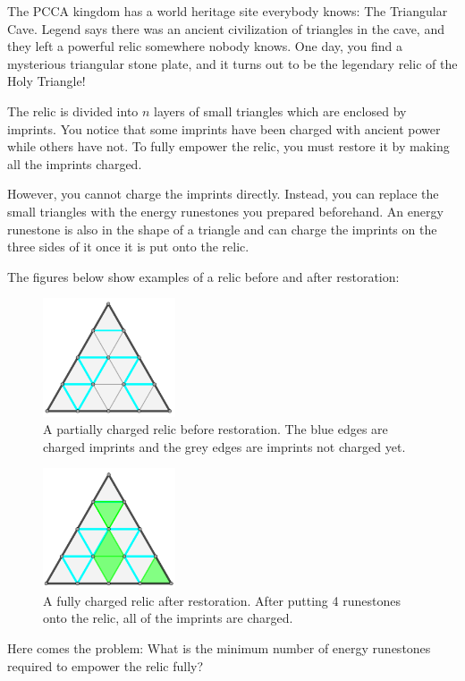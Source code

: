 The PCCA kingdom has a world heritage site everybody knows: The Triangular Cave.
Legend says there was an ancient civilization of triangles in the cave, and they left a powerful relic somewhere nobody knows.
One day, you find a mysterious triangular stone plate, and it turns out to be the legendary relic of the Holy Triangle!

The relic is divided into $n$ layers of small triangles which are enclosed by imprints.
You notice that some imprints have been charged with ancient power while others have not.
To fully empower the relic, you must restore it by making all the imprints charged.

However, you cannot charge the imprints directly.
Instead, you can replace the small triangles with the energy runestones you prepared beforehand.
An energy runestone is also in the shape of a triangle and can charge the imprints on the three sides of it once it is put onto the relic.

The figures below show examples of a relic before and after restoration:

\begin{figure}[h]
\center
\includegraphics[width=0.35\textwidth]{image/relic1.png}
\caption{A partially charged relic before restoration. The blue edges are charged imprints and the grey edges are imprints not charged yet.}
\end{figure}
\begin{figure}[h]
\center
\includegraphics[width=0.35\textwidth]{image/relic2.png}
\caption{A fully charged relic after restoration. After putting 4 runestones onto the relic, all of the imprints are charged.}
\end{figure}

\newpage

Here comes the problem: What is the minimum number of energy runestones required to empower the relic fully?